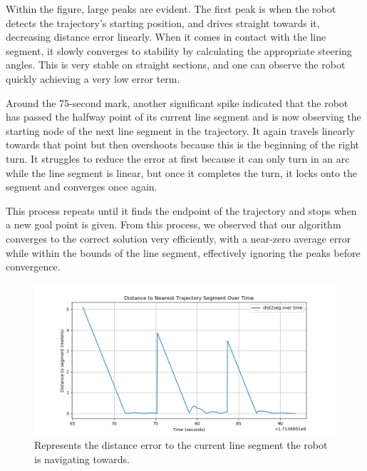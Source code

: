 \documentclass{article}
\begin{document}
Within the figure, large peaks are evident. The first peak is when the robot detects the trajectory's starting position, and drives straight towards it, decreasing distance error linearly. When it comes in contact with the line segment, it slowly converges to stability by calculating the appropriate steering angles. This is very stable on straight sections, and one can observe the robot quickly achieving a very low error term. 

Around the 75-second mark, another significant spike indicated that the robot has passed the halfway point of its current line segment and is now observing the starting node of the next line segment in the trajectory. It again travels linearly towards that point but then overshoots because this is the beginning of the right turn. It struggles to reduce the error at first because it can only turn in an arc while the line segment is linear, but once it completes the turn, it locks onto the segment and converges once again. 

This process repeats until it finds the endpoint of the trajectory and stops when a new goal point is given. From this process, we observed that our algorithm converges to the correct solution very efficiently, with a near-zero average error while within the bounds of the line segment, effectively ignoring the peaks before convergence. 

\begin{figure}[htbp]
  \centering
  \includegraphics[width=1\textwidth]{dist2seg_plot.png}
  \caption{Represents the distance error to the current line segment the robot is navigating towards.}
  \label{fig:failed_transform}
\end{figure}
\end{document}

